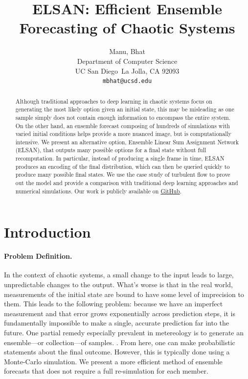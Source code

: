 \documentclass{article}
\title{ELSAN: Efficient Ensemble Forecasting of Chaotic Systems}
\author{%
  Manu, Bhat \\
  Department of Computer Science\\
  UC San Diego\
  La Jolla, CA 92093 \\
  \texttt{mbhat@ucsd.edu} \\
}
\begin{document}
\maketitle


\begin{abstract}
    Although traditional approaches to deep learning in chaotic systems focus on generating the most likely option given an initial state, this may be misleading as one sample simply does not contain enough information to encompass the entire system. On the other hand, an ensemble forecast composing of hundreds of simulations with varied initial conditions helps provide a more nuanced image, but is computationally intensive. We present an alternative option, Ensemble Linear Sum Assignment Network (ELSAN), that outputs many possible options for a final state without full recomputation. In particular, instead of producing a single frame in time, ELSAN produces an encoding of the final distribution, which can then be queried quickly to produce many possible final states. We use the case study of turbulent flow to prove out the model and provide a comparison with traditional deep learning approaches and numerical simulations. Our work is publicly available on \href{https://github.com/enigmurl/elsan}{GitHub}.
\end{abstract}

\section{Introduction}

\paragraph{Problem Definition.}

In the context of chaotic systems, a small change to the input leads to large, unpredictable changes to the output. What's worse is that in the real world, measurements of the initial state are bound to have some level of imprecision to them. This leads to the following problem: because we have an imperfect measurement and that error grows exponentially across prediction steps, it is fundamentally impossible to make a single, accurate prediction far into the future. One partial remedy especially prevalent in metereology is to generate an ensemble—or collection—of samples. \cite{TyphoonEnsemblePredictionSystemDevelopedattheJapanMeteorologicalAgency}. From here, one can make probabilistic statements about the final outcome. However, this is typically done using a Monte-Carlo simulation. We present a more efficient method of ensemble forecasts that does not require a full re-simulation for each member.
\end{document}

